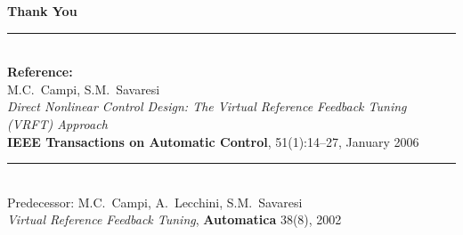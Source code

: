\documentclass[aspectratio=169]{beamer}
\begin{document}
\begin{frame}[plain]
  \begin{center}
    \vspace{1.5em}
    {\Large\color{darkgreen}\textbf{Thank You}}\\[1em]
    \rule{0.55\textwidth}{0.5pt}\\[1em]
    \textbf{Reference:}\\[0.4em]
    M.C.~Campi, S.M.~Savaresi\\
    \textit{Direct Nonlinear Control Design: The Virtual Reference Feedback Tuning (VRFT) Approach}\\
    \textbf{IEEE Transactions on Automatic Control}, 51(1):14--27, January 2006\\[1.5em]
    \rule{0.55\textwidth}{0.5pt}\\[0.8em]
    {\small Predecessor:} M.C.~Campi, A.~Lecchini, S.M.~Savaresi\\
    {\small \textit{Virtual Reference Feedback Tuning}, \textbf{Automatica} 38(8), 2002}
  \end{center}
\end{frame}
\end{document}
